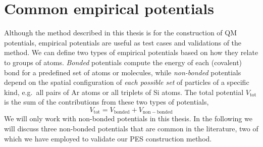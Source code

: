 \documentclass[twoside,english]{uiofysmaster}
\begin{document}
\section{Common empirical potentials}
Although the method described in this thesis is for the construction of QM potentials, empirical potentials
are useful as test cases and validations of the method. We can define two types of empirical potentials based on how they 
relate to groups of atoms. \textit{Bonded} potentials compute the energy of each (covalent) bond for a predefined set 
of atoms or molecules, while \textit{non-bonded} potentials depend on the spatial configuration of \textit{each possible set}
of particles of a specific kind, e.g.\ all pairs of Ar atoms or all triplets of Si atoms. The total potential $V_\mathrm{tot}$
is the sum of the contributions from these two types of potentials,
\begin{equation}
 V_{\mathrm{tot}} = V_{\mathrm{bonded}} + V_{\mathrm{non-bonded}}
\end{equation}
We will only work with non-bonded potentials in this thesis. In the following we will discuss three non-bonded potentials
that are common in the literature, two of which we have employed to validate our PES construction method. 
\end{document}
